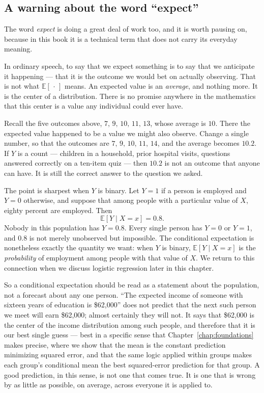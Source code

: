 \documentclass[11pt]{report}
\newcommand{\E}{\mathbb{E}}
\begin{document}
\subsection{A warning about the word ``expect''}

The word \emph{expect} is doing a great deal of work too, and it is worth pausing on, because in this book it is a technical term that does not carry its everyday meaning.

In ordinary speech, to say that we expect something is to say that we anticipate it happening --- that it is the outcome we would bet on actually observing. That is not what \(\E[\,\cdot\,]\) means. An expected value is an \emph{average}, and nothing more. It is the center of a distribution. There is no promise anywhere in the mathematics that this center is a value any individual could ever have.

Recall the five outcomes above, \(7,\,9,\,10,\,11,\,13\), whose average is \(10\). There the expected value happened to be a value we might also observe. Change a single number, so that the outcomes are \(7,\,9,\,10,\,11,\,14\), and the average becomes \(10.2\). If \(Y\) is a count --- children in a household, prior hospital visits, questions answered correctly on a ten-item quiz --- then \(10.2\) is not an outcome that anyone can have. It is still the correct answer to the question we asked.

The point is sharpest when \(Y\) is binary. Let \(Y=1\) if a person is employed and \(Y=0\) otherwise, and suppose that among people with a particular value of \(X\), eighty percent are employed. Then
\[
\E[Y\mid X=x]=0.8 .
\]
Nobody in this population has \(Y=0.8\). Every single person has \(Y=0\) or \(Y=1\), and \(0.8\) is not merely unobserved but impossible. The conditional expectation is nonetheless exactly the quantity we want: when \(Y\) is binary, \(\E[Y\mid X=x]\) is the \emph{probability} of employment among people with that value of \(X\). We return to this connection when we discuss logistic regression later in this chapter.

So a conditional expectation should be read as a statement about the population, not a forecast about any one person. ``The expected income of someone with sixteen years of education is \$62{,}000'' does not predict that the next such person we meet will earn \$62{,}000; almost certainly they will not. It says that \$62{,}000 is the center of the income distribution among such people, and therefore that it is our best single guess --- best in a specific sense that Chapter~\ref{chap:foundations} makes precise, where we show that the mean is the constant prediction minimizing squared error, and that the same logic applied within groups makes each group's conditional mean the best squared-error prediction for that group. A good prediction, in this sense, is not one that comes true. It is one that is wrong by as little as possible, on average, across everyone it is applied to.
\end{document}
